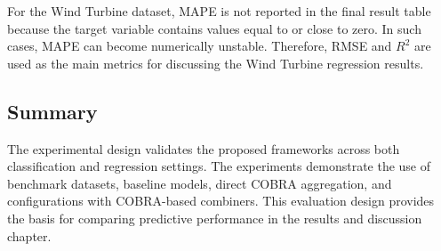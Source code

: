 For the Wind Turbine dataset, MAPE is not reported in the final result table because the target variable contains values equal to or close to zero. In such cases, MAPE can become numerically unstable. Therefore, RMSE and $R^2$ are used as the main metrics for discussing the Wind Turbine regression results.

\subsection{Summary}

\hs The experimental design validates the proposed frameworks across both classification and regression settings. The experiments demonstrate the use of benchmark datasets, baseline models, direct COBRA aggregation, and \KFCProcedure{} configurations with COBRA-based combiners. This evaluation design provides the basis for comparing predictive performance in the results and discussion chapter.



